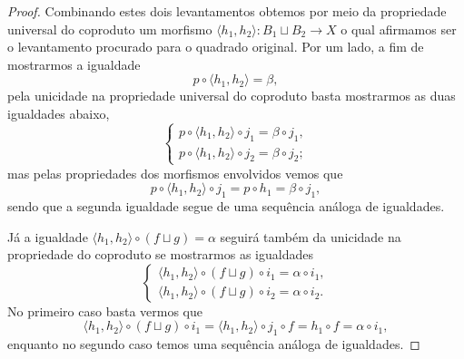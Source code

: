 \begin{proof}
  Combinando estes dois levantamentos obtemos por meio da propriedade universal do coproduto um morfismo $\langle h_{1},h_{2} \rangle: B_{1} \sqcup B_{2} \to X$ o qual afirmamos ser o levantamento procurado para o quadrado original.
  Por um lado, a fim de mostrarmos a igualdade
  \begin{displaymath}
    p \circ \langle h_{1},h_{2} \rangle = \beta,
  \end{displaymath}
  pela unicidade na propriedade universal do coproduto basta mostrarmos as duas igualdades abaixo,
  \begin{displaymath}
    \begin{cases}
      p \circ \langle h_{1}, h_{2} \rangle \circ j_{1} = \beta \circ j_{1}, \\
      p \circ \langle h_{1}, h_{2} \rangle \circ j_{2} = \beta \circ j_{2};
    \end{cases}
  \end{displaymath}
  mas pelas propriedades dos morfismos envolvidos vemos que
  \begin{displaymath}
    p \circ \langle h_{1}, h_{2} \rangle \circ j_{1} =  p \circ h_{1} = \beta \circ j_{1},
  \end{displaymath}
  sendo que a segunda igualdade segue de uma sequência análoga de igualdades.

  Já a igualdade $\langle h_{1}, h_{2} \rangle \circ (f \sqcup g) = \alpha$ seguirá também da unicidade na propriedade do coproduto se mostrarmos as igualdades
  \begin{displaymath}
    \begin{cases}
      \langle h_{1}, h_{2} \rangle \circ (f \sqcup g) \circ i_{1} = \alpha \circ i_{1}, \\
      \langle h_{1}, h_{2} \rangle \circ (f \sqcup g) \circ i_{2} = \alpha \circ i_{2}.
    \end{cases}
  \end{displaymath}
  No primeiro caso basta vermos que
  \begin{displaymath}
    \langle h_{1}, h_{2} \rangle \circ (f \sqcup g) \circ i_{1} = \langle h_{1}, h_{2} \rangle \circ j_{1} \circ f = h_{1} \circ f = \alpha \circ i_{1},
  \end{displaymath}
  enquanto no segundo caso temos uma sequência análoga de igualdades.


\end{proof}
